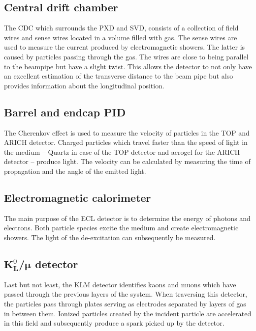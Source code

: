 \subsection{Central drift chamber}
\label{sec:detector_system_tracking_detectors}

The CDC which surrounds the PXD and SVD, consists of a collection of field wires and sense wires located in a volume filled with gas. The sense wires are used to measure the current produced by electromagnetic showers. The latter is caused by particles passing through the gas. The wires are close to being parallel to the beampipe but have a slight twist. This allows the detector to not only have an excellent estimation of the transverse distance to the beam pipe but also provides information about the longitudinal position.

\subsection{Barrel and endcap PID}
\label{sec:detector_system_barrel_and_endcap_pid}

The Cherenkov effect is used to measure the velocity of particles in the TOP and ARICH detector. Charged particles which travel faster than the speed of light in the medium -- Quartz in case of the TOP detector and aerogel for the ARICH detector -- produce light. The velocity can be calculated by measuring the time of propagation and the angle of the emitted light.

\subsection{Electromagnetic calorimeter}
\label{sec:detector_system_electromagnetic_calorimeter}

The main purpose of the ECL detector is to determine the energy of photons and electrons. Both particle species excite the medium and create electromagnetic showers. The light of the de-excitation can subsequently be measured.

\subsection{$\boldsymbol{K}^0_{\boldsymbol{L}}$/$\boldsymbol{\mu}$ detector}
\label{sec:detector_system_k0lmu}

Last but not least, the KLM detector identifies kaons and muons which have passed through the previous layers of the system. When traversing this detector, the particles pass through plates serving as electrodes separated by layers of gas in between them. Ionized particles created by the incident particle are accelerated in this field and subsequently produce a spark picked up by the detector.

